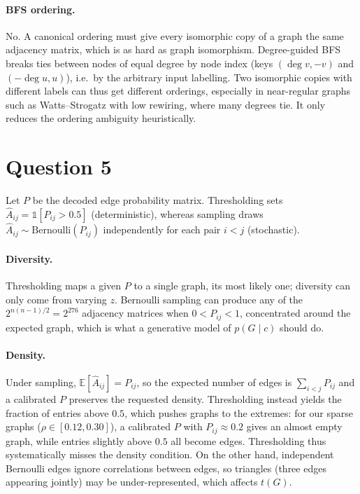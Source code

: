 \documentclass[a4paper]{article}
\begin{document}
\paragraph{BFS ordering.} No. A canonical ordering must give every isomorphic copy of a graph the same adjacency matrix, which is as hard as graph isomorphism. Degree-guided BFS breaks ties between nodes of equal degree by node index (keys $(\deg v, -v)$ and $(-\deg u, u)$), i.e.\ by the arbitrary input labelling. Two isomorphic copies with different labels can thus get different orderings, especially in near-regular graphs such as Watts--Strogatz with low rewiring, where many degrees tie. It only reduces the ordering ambiguity heuristically.


\section{Question 5}

Let $P$ be the decoded edge probability matrix. Thresholding sets $\hat{A}_{ij} = \mathbb{1}[P_{ij} > 0.5]$ (deterministic), whereas sampling draws $\hat{A}_{ij} \sim \mathrm{Bernoulli}(P_{ij})$ independently for each pair $i < j$ (stochastic).

\paragraph{Diversity.} Thresholding maps a given $P$ to a single graph, its most likely one; diversity can only come from varying $z$. Bernoulli sampling can produce any of the $2^{n(n-1)/2} = 2^{276}$ adjacency matrices when $0 < P_{ij} < 1$, concentrated around the expected graph, which is what a generative model of $p(G \mid c)$ should do.

\paragraph{Density.} Under sampling, $\mathbb{E}[\hat{A}_{ij}] = P_{ij}$, so the expected number of edges is $\sum_{i<j} P_{ij}$ and a calibrated $P$ preserves the requested density. Thresholding instead yields the fraction of entries above $0.5$, which pushes graphs to the extremes: for our sparse graphs ($\rho \in [0.12, 0.30]$), a calibrated $P$ with $P_{ij} \approx 0.2$ gives an almost empty graph, while entries slightly above $0.5$ all become edges. Thresholding thus systematically misses the density condition. On the other hand, independent Bernoulli edges ignore correlations between edges, so triangles (three edges appearing jointly) may be under-represented, which affects $t(G)$.
\end{document}
